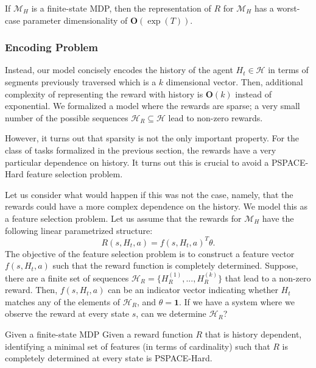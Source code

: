 \begin{proposition}
If $\mathcal{M}_H$ is a finite-state MDP, then the representation of $R$ for $\mathcal{M}_H$ has a worst-case parameter dimensionality of $\mathbf{O}(\exp(T))$.
\end{proposition}

\vspace{0.5em}

\subsubsection{Encoding Problem}
Instead, our model concisely encodes the history of the agent $H_t \in \mathcal{H}$ in terms of segments previously traversed which is a $k$ dimensional vector.
Then, additional complexity of representing the reward with history is $\mathbf{O}(k)$ instead of exponential.
We formalized a model where the rewards are sparse; a very small number of the possible sequences $\mathcal{H}_R \subseteq \mathcal{H}$ lead to non-zero rewards.


\iffalse
However, it turns out that sparsity is not the only important property.
For the class of tasks formalized in the previous section, the rewards have a very particular dependence on history.
It turns out this is crucial to avoid a PSPACE-Hard feature selection problem.

Let us consider what would happen if this was not the case, namely, that the rewards could have a more complex dependence on the history.
We model this as a feature selection problem.
Let us assume that the rewards for $\mathcal{M}_H$ have the following linear parametrized structure:
\[
R(s,H_t,a) =  f(s,H_t,a)^T \theta.
\]
The objective of the feature selection problem is to construct a feature vector $f(s,H_t,a)$ such that the reward function is completely determined.
Suppose, there are a finite set of sequences $\mathcal{H}_R=\{H_R^{(1)},...,H_R^{(k)}\}$ that lead to a non-zero reward.
Then, $f(s,H_t,a)$ can be an indicator vector indicating whether $H_t$ matches any of the elements of $\mathcal{H}_R$, and $\theta = \mathbf{1}$.
If we have a system where we observe the reward at every state $s$, can we determine $\mathcal{H}_R$?

\begin{proposition}
Given a finite-state MDP 
Given a reward function $R$ that is history dependent, identifying a minimal set of features (in terms of cardinality) such that $R$ is completely determined at every state is PSPACE-Hard.
\end{proposition}














